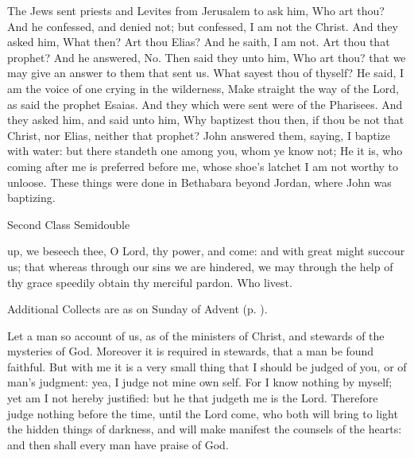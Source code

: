  The Jews sent priests and Levites from Jerusalem to ask him, Who art thou? And he confessed, and denied not; but confessed, I am not the Christ. And they asked him, What then? Art thou Elias? And he saith, I am not. Art thou that prophet? And he answered, No. Then said they unto him, Who art thou? that we may give an answer to them that sent us. What sayest thou of thyself? He said, I am the voice of one crying in the wilderness, Make straight the way of the Lord, as said the prophet Esaias. And they which were sent were of the Pharisees. And they asked him, and said unto him, Why baptizest thou then, if thou be not that Christ, nor Elias, neither that prophet? John answered them, saying, I baptize with water: but there standeth one among you, whom ye know not; He it is, who coming after me is preferred before me, whose shoe's latchet I am not worthy to unloose. These things were done in Bethabara beyond Jordan, where John was baptizing.

\begin{inhead}
{Second Class Semidouble}
\end{inhead}

\collect
{} up, we beseech thee, O Lord, thy power, and come: and with great might succour us; that whereas through our sins we are hindered, we may through the help of thy grace speedily obtain thy merciful pardon. Who livest.
\begin{rubric}
    Additional Collects are as on  Sunday of Advent (p. \pageref{AdventI}).
\end{rubric}

 Let a man so account of us, as of the ministers of Christ, and stewards of the mysteries of God. Moreover it is required in stewards, that a man be found faithful. But with me it is a very small thing that I should be judged of you, or of man's judgment: yea, I judge not mine own self. For I know nothing by myself; yet am I not hereby justified: but he that judgeth me is the Lord. Therefore judge nothing before the time, until the Lord come, who both will bring to light the hidden things of darkness, and will make manifest the counsels of the hearts: and then shall every man have praise of God.


